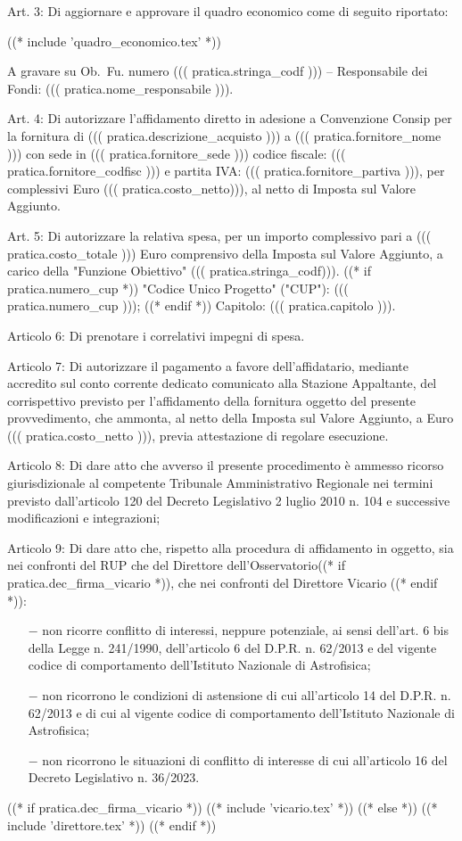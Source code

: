 Art. 3: Di aggiornare e approvare il quadro economico come di seguito riportato:

((* include 'quadro_economico.tex' *))

A gravare su Ob.~Fu. numero ((( pratica.stringa_codf ))) – Responsabile dei
Fondi: ((( pratica.nome_responsabile ))).

Art. 4: Di autorizzare l'affidamento diretto in adesione a Convenzione Consip per  la fornitura di
 ((( pratica.descrizione_acquisto ))) a
((( pratica.fornitore_nome ))) con sede in  ((( pratica.fornitore_sede )))
codice fiscale: ((( pratica.fornitore_codfisc ))) e partita IVA:
((( pratica.fornitore_partiva ))), per complessivi Euro ((( pratica.costo_netto))), al netto 
di Imposta sul Valore Aggiunto.

Art. 5: Di autorizzare la relativa spesa, per un importo complessivo
pari a ((( pratica.costo_totale ))) Euro comprensivo della Imposta sul
Valore Aggiunto, a carico della "Funzione Obiettivo" ((( pratica.stringa_codf))).
((* if pratica.numero_cup *)) "Codice Unico Progetto" ("CUP"): ((( pratica.numero_cup ))); ((* endif *))
Capitolo: ((( pratica.capitolo ))).

Articolo 6: Di prenotare i correlativi impegni di spesa.

Articolo 7: Di autorizzare il pagamento a favore dell'affidatario,
mediante accredito sul conto corrente dedicato comunicato alla Stazione
Appaltante, del corrispettivo previsto per l'affidamento della
fornitura oggetto del presente provvedimento, che ammonta, al netto
della Imposta sul Valore Aggiunto, a Euro ((( pratica.costo_netto ))),
previa attestazione di regolare esecuzione.

Articolo 8: Di dare atto che avverso il presente procedimento è ammesso
ricorso giurisdizionale al competente Tribunale Amministrativo Regionale
nei termini previsto dall'articolo 120 del Decreto Legislativo
2 luglio 2010 n. 104 e successive modificazioni e integrazioni;

Articolo 9: Di dare atto che, rispetto alla procedura di affidamento in
oggetto, sia nei confronti del RUP che del Direttore
dell'Osservatorio((* if pratica.dec_firma_vicario *)), che nei confronti del Direttore Vicario ((* endif *)):

\begin{itemize}

\item[$-$]  non ricorre conflitto di interessi, neppure potenziale, ai
sensi dell'art. 6 bis della Legge n. 241/1990, dell'articolo 6 del
D.P.R. n. 62/2013 e del vigente codice di comportamento dell'Istituto
Nazionale di Astrofisica;

\item[$-$]  non ricorrono le condizioni di astensione di cui
all'articolo 14 del D.P.R. n. 62/2013 e di cui al vigente codice di
comportamento dell'Istituto Nazionale di Astrofisica;

\item[$-$] non ricorrono le situazioni di conflitto di interesse di cui
all'articolo 16 del Decreto Legislativo n. 36/2023.

\end{itemize}

((* if pratica.dec_firma_vicario *))
((* include 'vicario.tex' *))
((* else *))
((* include 'direttore.tex' *))
((* endif *))

